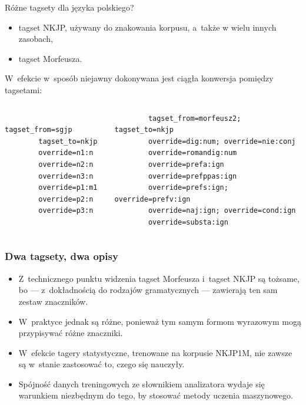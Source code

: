 \documentclass[xcolor=dvipsnames,polish]{beamer}
\begin{document}
\begin{frame}[fragile]{Różne tagsety dla języka polskiego?}
  \begin{itemize}
    \item tagset NKJP, używany do znakowania korpusu, a~także w wielu innych zasobach,
    \item tagset Morfeusza.
  \end{itemize}
  \vspace{0.5cm}

  W~efekcie w~sposób niejawny dokonywana jest ciągła konwersja pomiędzy tagsetami:
  \begin{columns}[c]
      \footnotesize
      \begin{verbatim}
        tagset_from=sgjp
        tagset_to=nkjp
        override=n1:n
        override=n2:n
        override=n3:n
        override=p1:m1
        override=p2:n
        override=p3:n
      \end{verbatim}
      \footnotesize
      \begin{verbatim}
        tagset_from=morfeusz2; tagset_to=nkjp
        override=dig:num; override=nie:conj
        override=romandig:num
        override=prefa:ign
        override=prefppas:ign
        override=prefs:ign; override=prefv:ign
        override=naj:ign; override=cond:ign
        override=substa:ign
      \end{verbatim}
    \end{columns}
\end{frame}


\begin{frame}
  \frametitle{Dwa tagsety, dwa opisy}

  \begin{itemize}
  \item Z~technicznego punktu widzenia tagset Morfeusza i~tagset NKJP są
    tożsame, bo — z~dokładnością do rodzajów gramatycznych — zawierają
    ten sam zestaw znaczników.
  \item W~praktyce jednak są różne, ponieważ tym samym formom
    wyrazowym mogą przypisywać różne znaczniki.
  \item W~efekcie tagery statystyczne, trenowane na korpusie NKJP1M,
    nie zawsze są w~stanie zastosować to, czego się nauczyły.
  \item Spójność danych treningowych ze słownikiem analizatora
    wydaje się warunkiem niezbędnym do tego, by stosować metody
    uczenia maszynowego.
  \end{itemize}


\end{frame}
\end{document}
